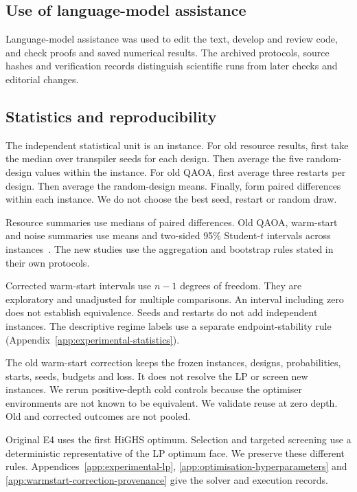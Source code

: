 \documentclass[a4paper,onecolumn,11pt,unpublished]{quantumarticle}
\theoremstyle{remark}
\begin{document}
\subsection{Use of language-model assistance}
Language-model assistance was used to edit the text, develop and review
code, and check proofs and saved numerical results. The archived protocols,
source hashes and verification records distinguish scientific runs from
later checks and editorial changes.

\subsection{Statistics and reproducibility}
\label{sec:statistics-reproducibility}

The independent statistical unit is an instance.
For old resource results, first take the median over transpiler seeds for
each design. Then average the five random-design values within the instance.
For old QAOA, first average three restarts per design. Then average the
random-design means. Finally, form paired differences within each instance.
We do not choose the best seed, restart or random draw.

Resource summaries use medians of paired differences.
Old QAOA, warm-start and noise summaries use means and two-sided 95\%
Student-$t$ intervals across instances~\cite{Student1908}.
The new studies use the aggregation and bootstrap rules stated in their
own protocols.

Corrected warm-start intervals use $n-1$ degrees of freedom.
They are exploratory and unadjusted for multiple comparisons.
An interval including zero does not establish equivalence.
Seeds and restarts do not add independent instances.
The descriptive regime labels use a separate endpoint-stability rule
(Appendix~\ref{app:experimental-statistics}).

The old warm-start correction keeps the frozen instances, designs,
probabilities, starts, seeds, budgets and loss.
It does not resolve the LP or screen new instances.
We rerun positive-depth cold controls because the optimiser environments
are not known to be equivalent. We validate reuse at zero depth.
Old and corrected outcomes are not pooled.

Original E4 uses the first HiGHS optimum.
Selection and targeted screening use a deterministic representative of the
LP optimum face. We preserve these different rules.
Appendices~\ref{app:experimental-lp},
\ref{app:optimisation-hyperparameters} and
\ref{app:warmstart-correction-provenance} give the solver and execution records.
\end{document}
